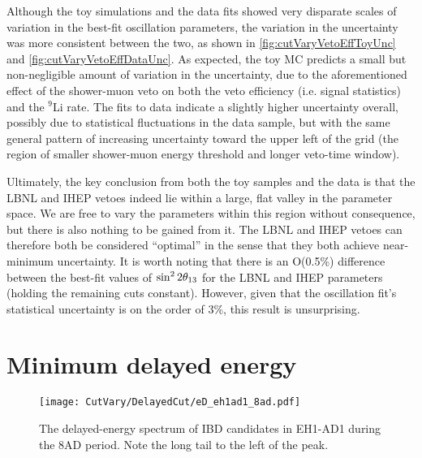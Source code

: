 \documentclass[../thesis.tex]{subfiles}
\begin{document}
Although the toy simulations and the data fits showed very disparate scales of variation in the best-fit oscillation parameters, the variation in the uncertainty was more consistent between the two, as shown in \autoref{fig:cutVaryVetoEffToyUnc} and \autoref{fig:cutVaryVetoEffDataUnc}. As expected, the toy MC predicts a small but non-negligible amount of variation in the uncertainty, due to the aforementioned effect of the shower-muon veto on both the veto efficiency (i.e. signal statistics) and the $^9$Li rate. The fits to data indicate a slightly higher uncertainty overall, possibly due to statistical fluctuations in the data sample, but with the same general pattern of increasing uncertainty toward the upper left of the grid (the region of smaller shower-muon energy threshold and longer veto-time window).

Ultimately, the key conclusion from both the toy samples and the data is that the LBNL and IHEP vetoes indeed lie within a large, flat valley in the parameter space. We are free to vary the parameters within this region without consequence, but there is also nothing to be gained from it. The LBNL and IHEP vetoes can therefore both be considered ``optimal'' in the sense that they both achieve near-minimum uncertainty. It is worth noting that there is an O(0.5\%) difference between the best-fit values of $\sin^2 2\theta_{13}$ for the LBNL and IHEP parameters (holding the remaining cuts constant). However, given that the oscillation fit's statistical uncertainty is on the order of 3\%, this result is unsurprising.

\begin{comment}
XXX We'd hope that both the LBNL and IHEP points give closer results. We'll see when we regenerate. Ideally, we see that the LBNL and IHEP points both lie within a large region of minimally varying best-fit $\SinSq$. Curious about the effects of using BCW binning. We should do both, so 14x14x2 = 392 sel/fits.
\end{comment}
\section{Minimum delayed energy}
\label{sec:cutVaryMinDelayed}

\begin{figure}[ht]
  \texttt{[image: CutVary/DelayedCut/eD\_eh1ad1\_8ad.pdf]}
  \caption{The delayed-energy spectrum of IBD candidates in EH1-AD1 during the 8AD period. Note the long tail to the left of the peak.}
  \label{fig:cutVaryDelCutDelSpec}
\end{figure}
\end{document}

